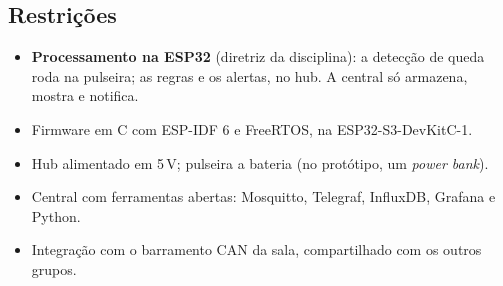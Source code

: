 \subsection{Restrições}

\begin{itemize}
  \item \textbf{Processamento na ESP32} (diretriz da disciplina): a detecção de queda roda na
        pulseira; as regras e os alertas, no hub. A central só armazena, mostra e notifica.
  \item Firmware em C com ESP-IDF 6 e FreeRTOS, na ESP32-S3-DevKitC-1.
  \item Hub alimentado em 5\,V; pulseira a bateria (no protótipo, um \textit{power bank}).
  \item Central com ferramentas abertas: Mosquitto, Telegraf, InfluxDB, Grafana e Python.
  \item Integração com o barramento CAN da sala, compartilhado com os outros grupos.
\end{itemize}
